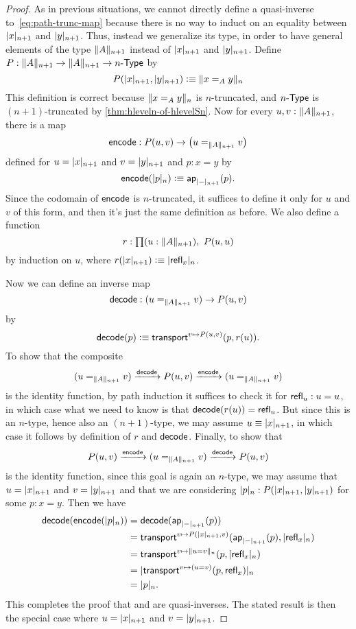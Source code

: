 \begin{proof}
  As in previous situations, we cannot directly define a quasi-inverse to~\eqref{eq:path-trunc-map} because there is no way to induct on an
equality between $\tproj {n+1}x$ and $\tproj {n+1}y$.
  Thus, instead we generalize its type, in order to have general elements of the type $\trunc{n+1}A$ instead of $\tproj {n+1}x$ and $\tproj
{n+1}y$.
  Define $P:\trunc {n+1}A\to\trunc {n+1}A\to\typele{n}$ by
  \[P(\tproj {n+1}x,\tproj {n+1}y)\defeq \trunc n{x=_Ay}\]
  This definition is correct because $\trunc n{x=_Ay}$ is $n$-truncated, and $\typele{n}$ is $(n+1)$-truncated by
\autoref{thm:hleveln-of-hlevelSn}.
  Now for every $u,v:\trunc{n+1}A$, there is a map
  \[\encode:P(u,v) \to \big(u=_{\trunc{n+1}A}v\big)\]
  defined for $u=\tproj {n+1}x$ and $v=\tproj {n+1}y$ and $p:x=y$ by
  \[\encode(\tproj n{p})\defeq \apfunc{\tproj{n+1}-} (p).\]
  Since the codomain of $\encode$ is $n$-truncated, it suffices to define it only for $u$ and $v$ of this form, and then it's just the same
definition as before.
  We also define a function
  \[ r : \prd{u:\trunc{n+1} A} P(u,u) \]
  by induction on $u$, where $r(\tproj{n+1} x) \defeq \tproj n {\refl x}$.

  Now we can define an inverse map
  \[\decode: (u=_{\trunc{n+1}A}v) \to P(u,v)\]
  by
  \[\decode(p) \defeq \transfib{v\mapsto P(u,v)}{p}{r(u)}. \]
  To show that the composite
  \[ (u=_{\trunc{n+1}A}v) \xrightarrow{\decode} P(u,v) \xrightarrow{\encode} (u=_{\trunc{n+1}A}v) \]
  is the identity function, by path induction it suffices to check it for $\refl u : u=u$, in which case what we need to know is that
$\decode(r(u)) = \refl{u}$.
  But since this is an $n$-type, hence also an $(n+1)$-type, we may assume $u\jdeq \tproj {n+1} x$, in which case it follows by definition
of $r$ and $\decode$.
  Finally, to show that 
  \[ P(u,v) \xrightarrow{\encode} (u=_{\trunc{n+1}A}v) \xrightarrow{\decode} P(u,v) \]
  is the identity function, since this goal is again an $n$-type, we may assume that $u=\tproj {n+1}x$ and $v=\tproj {n+1}y$ and that we are
considering $\tproj n p:P(\tproj{n+1}x,\tproj{n+1}y)$ for some $p:x=y$.
  Then we have
  \begin{align*}
    \decode(\encode(\tproj n p)) &= \decode(\apfunc{\tproj{n+1}-}(p))\\
    &= \transfib{v\mapsto P(\tproj{n+1}x,v)}{\apfunc{\tproj{n+1}-}(p)}{\tproj n {\refl x}}\\
    &= \transfib{v\mapsto \trunc n{u=v}}{p}{\tproj n {\refl x}}\\
    &= \tproj n {\transfib{v \mapsto (u=v)}{p}{\refl x}}\\
    &= \tproj n p.
  \end{align*}
  This completes the proof that \encode and \decode are quasi-inverses.
  The stated result is then the special case where $u=\tproj {n+1}x$ and $v=\tproj {n+1}y$.
\end{proof}

